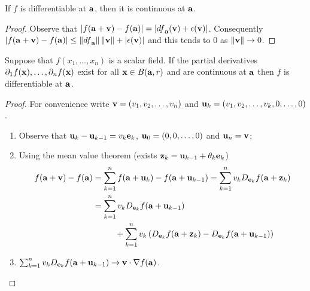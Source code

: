 \begin{theorem*}
    If \(f\) is differentiable at \(\aa\), then it is continuous at \(\aa\).
\end{theorem*}
\begin{proof}
    Observe that \(\abs{f(\aa+\vv)-f(\aa)} = \abs{   {df}_{\aa}(\vv) + \epsilon(\vv)  }\).
    Consequently \( \abs{f(\aa+\vv)-f(\aa)} \leq \norm{  {df}_{\aa} } \norm{\vv} + \abs{\epsilon(\vv)} \) and this tends to \(0\) as \(\norm{\vv} \to 0\).
\end{proof}

\begin{theorem}
    Suppose that \(f(x_1,\ldots,x_n)\) is a scalar field.
    If the partial derivatives \(\partial_1 f(\xx), \ldots, \partial_nf(\xx)\) exist for all \(\xx\in B(\aa,r)\) and are continuous at \(\aa\) then \(f\) is differentiable at \(\aa\).
\end{theorem}

\begin{proof}
    For convenience write \(\vv = (v_1,v_2,\ldots,v_n)\)     and     \(\uu_k = (v_1,v_2,\ldots,v_k,0,\ldots,0)\).
    \begin{enumerate}
        \item Observe that \(\uu_k - \uu_{k-1} = v_k \ee_k\), \(\uu_0 = (0,0,\ldots,0)\) and \(\uu_n = \vv\);
        \item Using the mean value theorem (exists \( \zz_k = \uu_{k-1}+ \theta_k \ee_k\)) \vspace{-0.9em}
              \[
                  \begin{aligned}
                      f(\aa+\vv) - f(\aa)
                       & = \sum_{k=1}^{n} f(\aa + \uu_k) - f(\aa + \uu_{k-1})
                      = \sum_{k=1}^{n} v_k  D_{\ee_k}f(\aa +  \zz_k)                                                                  \\
                       & = \sum_{k=1}^{n} v_k  D_{\ee_k}f(\aa + \uu_{k-1})                                                            \\
                       & \ \ \ \ \ \ \ \ + \sum_{k=1}^{n}  v_k \left(  D_{\ee_k}f(\aa +  \zz_k)-  D_{\ee_k}f(\aa + \uu_{k-1}) \right)
                  \end{aligned}
              \]
        \item \(\sum_{k=1}^{n} v_k  D_{\ee_k}f(\aa + \uu_{k-1}) \to \vv \cdot \nabla f(\aa)\). \qedhere
    \end{enumerate}
\end{proof}



